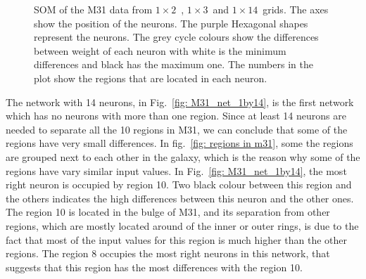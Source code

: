         \begin{figure}
            \hfill
             \hfill
            \caption{SOM of the M31 data from $1\times2$~, $1\times3$~and $1\times14$~grids. The axes show the position of the neurons. The purple Hexagonal shapes represent the neurons. The grey cycle colours show the differences between weight of each neuron with white is the minimum differences and black has the maximum one. The numbers in the plot show the regions that are located in each neuron.}
            \label{fig: M31_nets_1d}
        \end{figure}
        
        The network with 14 neurons, in Fig.~\ref{fig: M31_net_1by14}, is the first network which has no neurons with more than one region.
        Since at least 14 neurons are needed to separate all the 10 regions in M31, we can conclude that some of the regions have very small differences.
        In fig.~\ref{fig: regions in m31}, some the regions are grouped next to each other in the galaxy, which is the reason why some of the regions have vary similar input values.
        In Fig.~\ref{fig: M31_net_1by14}, the most right neuron is occupied by region 10.
        Two black colour between this region and the others indicates the high differences between this neuron and the other ones.
        The region 10 is located in the bulge of M31, and its separation from other regions, which are mostly located around of the inner or outer rings, is due to the fact that most of the input values for this region is much higher than the other regions.
        The region 8 occupies the most right neurons in this network, that suggests that this region has the most differences with the region 10.
        
